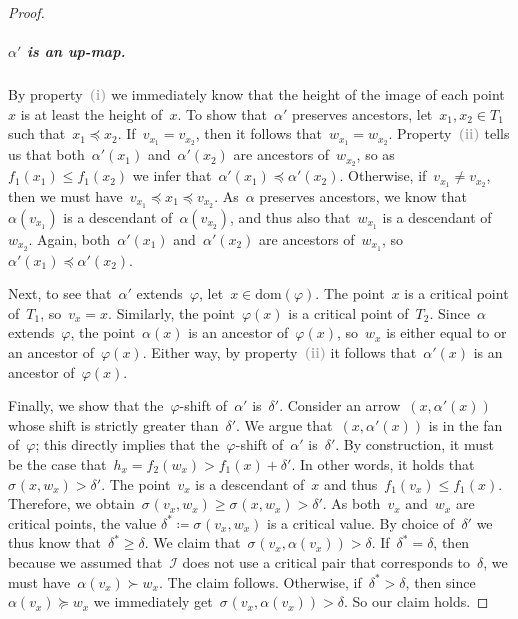 \documentclass[a4paper,UKenglish, autoref, thm-restate, cleveref]{lipics-v2021}
\newcommand{\dom}{\mathrm{dom}}
\newcommand{\shift}[1]{\sigma_{#1}}
\renewcommand{\phi}{\varphi}
\newcommand{\I}{\mathcal{I}}
\newcommand{\enumit}[1]{\textcolor{darkgray}{\sffamily\bfseries\upshape\mathversion{bold}#1}}
\begin{document}
\begin{proof}
\subparagraph*{$\alpha'$ is an up-map.}
By property~\enumit{(i)} we immediately know that the height of the image of each point~$x$ is at least the height of~$x$.
To show that~$\alpha'$ preserves ancestors, let~$x_1, x_2 \in T_1$ such that~$x_1 \preceq x_2$.
If~$v_{x_1} = v_{x_2}$, then it follows that~$w_{x_1} = w_{x_2}$.
Property~\enumit{(ii)} tells us that both~$\alpha'(x_1)$ and~$\alpha'(x_2)$ are ancestors of~$w_{x_2}$, so as~$f_1(x_1) \le f_1(x_2)$ we infer that~$\alpha'(x_1) \preceq \alpha'(x_2)$.
Otherwise, if~$v_{x_1} \neq v_{x_2}$, then we must have~$v_{x_1} \preceq x_1 \preceq v_{x_2}$.
As~$\alpha$ preserves ancestors, we know that~$\alpha(v_{x_1})$ is a descendant of~$\alpha(v_{x_2})$, and thus also that~$w_{x_1}$ is a descendant of~$w_{x_2}$.
Again, both~$\alpha'(x_1)$ and~$\alpha'(x_2)$ are ancestors of~$w_{x_1}$, so~$\alpha'(x_1) \preceq \alpha'(x_2)$.

Next, to see that~$\alpha'$ extends~$\phi$, let~$x \in \dom(\phi)$.
The point~$x$ is a critical point of~$T_1$, so~$v_x = x$.
Similarly, the point~$\phi(x)$ is a critical point of~$T_2$.
Since~$\alpha$ extends~$\phi$, the point~$\alpha(x)$ is an ancestor of~$\phi(x)$, so~$w_x$ is either equal to or an ancestor of~$\phi(x)$.
Either way, by property~\enumit{(ii)} it follows that~$\alpha'(x)$ is an ancestor of~$\phi(x)$.

Finally, we show that the~$\phi$-shift of~$\alpha'$ is~$\delta'$.
Consider an arrow~$(x, \alpha'(x))$ whose shift is strictly greater than~$\delta'$.
We argue that~$(x, \alpha'(x))$ is in the fan of~$\phi$; this directly implies that the~$\phi$-shift of~$\alpha'$ is~$\delta'$.
By construction, it must be the case that~$h_x = f_2(w_x) > f_1(x) + \delta'$.
In other words, it holds that~$\shift{}(x, w_x) > \delta'$.
The point~$v_x$ is a descendant of~$x$ and thus~$f_1(v_x) \le f_1(x)$.
Therefore, we obtain~$\shift{}(v_x, w_x) \ge \shift{}(x, w_x) > \delta'$.
As both~$v_x$ and~$w_x$ are critical points, the value $\delta^* \coloneqq \shift{}(v_x, w_x)$ is a critical value.
By choice of~$\delta'$ we thus know that~$\delta^* \ge \delta$.
We claim that~$\shift{}(v_x, \alpha(v_x)) > \delta$.
If~$\delta^* = \delta$, then because we assumed that~$\I$ does not use a critical pair that corresponds to~$\delta$, we must have~$\alpha(v_x) \succ w_x$.
The claim follows.
Otherwise, if~$\delta^* > \delta$, then since~$\alpha(v_x) \succeq w_x$ we immediately get~$\shift{}(v_x, \alpha(v_x)) > \delta$.
So our claim holds.


\end{proof}
\end{document}
